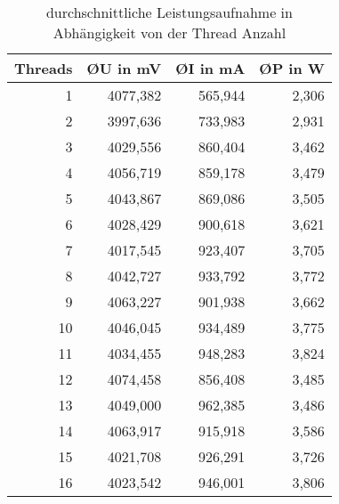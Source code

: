 \begin{table}[htbp]
  \centering
  \caption{durchschnittliche Leistungsaufnahme in Abh\"angigkeit von der Thread Anzahl}
    \begin{tabular}{rrrr}
    \toprule
    \multicolumn{1}{c}{Threads} & \multicolumn{1}{c}{\O U in mV} & \multicolumn{1}{c}{\O I in mA} & \multicolumn{1}{c}{\O P in W} \\
    \midrule
    1     & 4077,382 & 565,944 & 2,306 \\
    \midrule
    2     & 3997,636 & 733,983 & 2,931 \\
    \midrule
    3     & 4029,556 & 860,404 & 3,462 \\
    \midrule
    4     & 4056,719 & 859,178 & 3,479 \\
    \midrule
    5     & 4043,867 & 869,086 & 3,505 \\
    \midrule
    6     & 4028,429 & 900,618 & 3,621 \\
    \midrule
    7     & 4017,545 & 923,407 & 3,705 \\
    \midrule
    8     & 4042,727 & 933,792 & 3,772 \\
    \midrule
    9     & 4063,227 & 901,938 & 3,662 \\
    \midrule
    10    & 4046,045 & 934,489 & 3,775 \\
    \midrule
    11    & 4034,455 & 948,283 & 3,824 \\
    \midrule
    12    & 4074,458 & 856,408 & 3,485 \\
    \midrule
    13    & 4049,000 & 962,385 & 3,486 \\
    \midrule
    14    & 4063,917 & 915,918 & 3,586 \\
    \midrule
    15    & 4021,708 & 926,291 & 3,726 \\
    \midrule
    16    & 4023,542 & 946,001 & 3,806 \\
    \bottomrule
    \end{tabular}%
  \label{tab:Base64Leistung}%
\end{table}%
